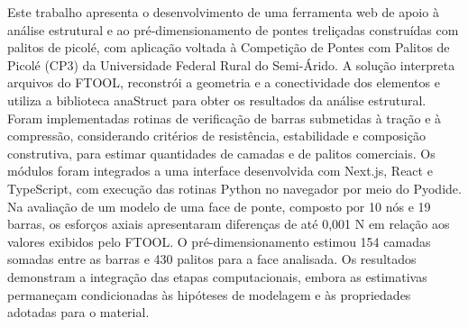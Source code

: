 Este trabalho apresenta o desenvolvimento de uma ferramenta web de apoio à análise estrutural e ao pré-dimensionamento de pontes treliçadas construídas com palitos de picolé, com aplicação voltada à Competição de Pontes com Palitos de Picolé (CP3) da Universidade Federal Rural do Semi-Árido. A solução interpreta arquivos do FTOOL, reconstrói a geometria e a conectividade dos elementos e utiliza a biblioteca anaStruct para obter os resultados da análise estrutural. Foram implementadas rotinas de verificação de barras submetidas à tração e à compressão, considerando critérios de resistência, estabilidade e composição construtiva, para estimar quantidades de camadas e de palitos comerciais. Os módulos foram integrados a uma interface desenvolvida com Next.js, React e TypeScript, com execução das rotinas Python no navegador por meio do Pyodide. Na avaliação de um modelo de uma face de ponte, composto por 10 nós e 19 barras, os esforços axiais apresentaram diferenças de até 0,001 N em relação aos valores exibidos pelo FTOOL. O pré-dimensionamento estimou 154 camadas somadas entre as barras e 430 palitos para a face analisada. Os resultados demonstram a integração das etapas computacionais, embora as estimativas permaneçam condicionadas às hipóteses de modelagem e às propriedades adotadas para o material.


